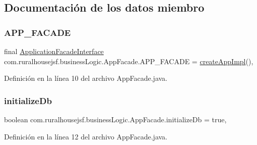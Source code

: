 \subsection{Documentación de los datos miembro}
\mbox{\label{classcom_1_1ruralhousejsf_1_1business_logic_1_1_app_facade_a112b5fb14ea720f893a3c52a26a775c9}} 
\subsubsection{\texorpdfstring{APP\_FACADE}{APP\_FACADE}}
{\footnotesize\ttfamily final \mbox{\hyperlink{interfacecom_1_1ruralhousejsf_1_1business_logic_1_1_application_facade_interface}{Application\+Facade\+Interface}} com.\+ruralhousejsf.\+business\+Logic.\+App\+Facade.\+A\+P\+P\+\_\+\+F\+A\+C\+A\+DE = \mbox{\hyperlink{classcom_1_1ruralhousejsf_1_1business_logic_1_1_app_facade_a8f4d396c7d2ce6ba084554d68385fc34}{create\+App\+Impl}}()\hspace{0.3cm}{\ttfamily [static]}, {\ttfamily [private]}}



Definición en la línea 10 del archivo App\+Facade.\+java.

\mbox{\label{classcom_1_1ruralhousejsf_1_1business_logic_1_1_app_facade_a08e1f188faabf8bef71610c49bdd5d84}} 
\subsubsection{\texorpdfstring{initializeDb}{initializeDb}}
{\footnotesize\ttfamily boolean com.\+ruralhousejsf.\+business\+Logic.\+App\+Facade.\+initialize\+Db = true\hspace{0.3cm}{\ttfamily [static]}, {\ttfamily [private]}}



Definición en la línea 12 del archivo App\+Facade.\+java.

